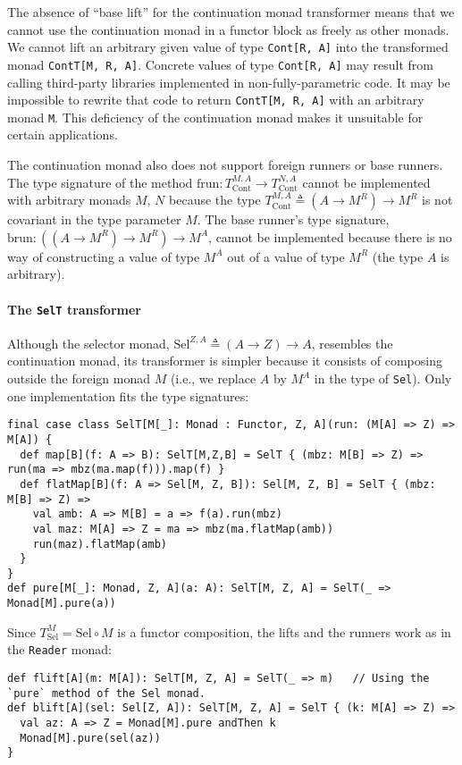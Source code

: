 The absence of \textsf{``}base lift\textsf{''} for the continuation monad transformer
means that we cannot use the continuation monad in a functor block
as freely as other monads. We cannot lift an arbitrary given value
of type \lstinline!Cont[R, A]! into the transformed monad \lstinline!ContT[M, R, A]!.
Concrete values of type \lstinline!Cont[R, A]! may result from calling
third-party libraries implemented in non-fully-parametric code. It
may be impossible to rewrite that code to return \lstinline!ContT[M, R, A]!
with an arbitrary monad \lstinline!M!. This deficiency of the continuation
monad makes it unsuitable for certain applications. 

The continuation monad also does not support foreign runners or base
runners. The type signature of the method $\text{frun}:T_{\text{Cont}}^{M,A}\rightarrow T_{\text{Cont}}^{N,A}$
cannot be implemented with arbitrary monads $M$, $N$ because the
type $T_{\text{Cont}}^{M,A}\triangleq(A\rightarrow M^{R})\rightarrow M^{R}$
is not covariant in the type parameter $M$. The base runner\textsf{'}s type
signature, $\text{brun}:((A\rightarrow M^{R})\rightarrow M^{R})\rightarrow M^{A}$,
cannot be implemented because there is no way of constructing a value
of type $M^{A}$ out of a value of type $M^{R}$ (the type $A$ is
arbitrary).

\paragraph{The \texttt{SelT} transformer}

Although the selector monad, $\text{Sel}^{Z,A}\triangleq\left(A\rightarrow Z\right)\rightarrow A$,
resembles the continuation monad, its transformer is simpler because
it consists of composing outside the foreign monad $M$ (i.e., we
replace $A$ by $M^{A}$ in the type of \lstinline!Sel!). Only one
implementation fits the type signatures:
\begin{lstlisting}
final case class SelT[M[_]: Monad : Functor, Z, A](run: (M[A] => Z) => M[A]) {
  def map[B](f: A => B): SelT[M,Z,B] = SelT { (mbz: M[B] => Z) => run(ma => mbz(ma.map(f))).map(f) }
  def flatMap[B](f: A => Sel[M, Z, B]): Sel[M, Z, B] = SelT { (mbz: M[B] => Z) =>
    val amb: A => M[B] = a => f(a).run(mbz)
    val maz: M[A] => Z = ma => mbz(ma.flatMap(amb))
    run(maz).flatMap(amb)
  }
}
def pure[M[_]: Monad, Z, A](a: A): SelT[M, Z, A] = SelT(_ => Monad[M].pure(a))
\end{lstlisting}
Since $T_{\text{Sel}}^{M}=\text{Sel}\circ M$ is a functor composition,
the lifts and the runners work as in the \lstinline!Reader! monad:
\begin{lstlisting}
def flift[A](m: M[A]): SelT[M, Z, A] = SelT(_ => m)   // Using the `pure` method of the Sel monad.
def blift[A](sel: Sel[Z, A]): SelT[M, Z, A] = SelT { (k: M[A] => Z) =>
  val az: A => Z = Monad[M].pure andThen k
  Monad[M].pure(sel(az))
}
\end{lstlisting}


